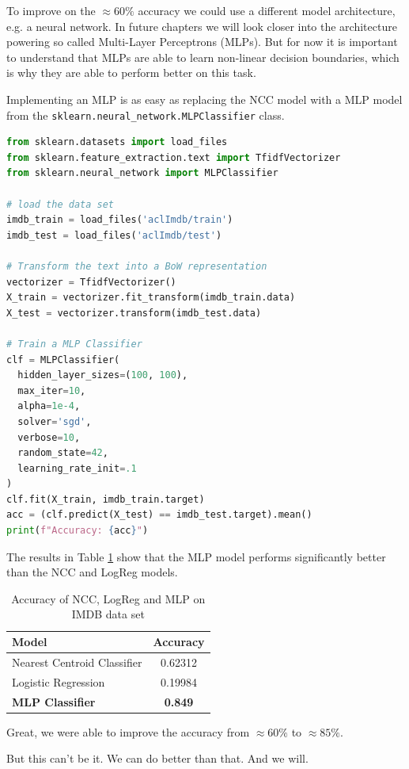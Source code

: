 To improve on the $\approx 60\%$ accuracy we could use a different model architecture, e.g. a neural network.
In future chapters we will look closer into the architecture powering so called Multi-Layer Perceptrons (MLPs).
But for now it is important to understand that MLPs are able to learn non-linear decision boundaries, which is why they are able to perform better on this task.

Implementing an MLP is as easy as replacing the NCC model with a MLP model from the \lstinline{sklearn.neural_network.MLPClassifier} class.
\begin{lstlisting}[language=Python, caption={IMDB example with MLP}, label={code:imdb-mlp}]
from sklearn.datasets import load_files
from sklearn.feature_extraction.text import TfidfVectorizer
from sklearn.neural_network import MLPClassifier

# load the data set
imdb_train = load_files('aclImdb/train')
imdb_test = load_files('aclImdb/test')

# Transform the text into a BoW representation
vectorizer = TfidfVectorizer()
X_train = vectorizer.fit_transform(imdb_train.data)
X_test = vectorizer.transform(imdb_test.data)

# Train a MLP Classifier
clf = MLPClassifier(
  hidden_layer_sizes=(100, 100),
  max_iter=10,
  alpha=1e-4,
  solver='sgd',
  verbose=10,
  random_state=42,
  learning_rate_init=.1
)
clf.fit(X_train, imdb_train.target)
acc = (clf.predict(X_test) == imdb_test.target).mean()
print(f"Accuracy: {acc}")
\end{lstlisting}
The results in Table \ref{tab:imdb-mlp} show that the MLP model performs significantly better than the NCC and LogReg models.

\begin{table}[h]
  \centering
  \begin{tabular}{|l|c|}
    \hline
    \textbf{Model} & \textbf{Accuracy} \\
    \hline
    Nearest Centroid Classifier & 0.62312\\
    Logistic Regression & 0.19984\\
    \textbf{MLP Classifier} & \textbf{0.849}\\
    \hline
  \end{tabular}
  \caption{Accuracy of NCC, LogReg and MLP on IMDB data set}
  \label{tab:imdb-mlp}
\end{table}
Great, we were able to improve the accuracy from $\approx 60\%$ to $\approx 85\%$.

But this can't be it. We can do better than that. And we will.

